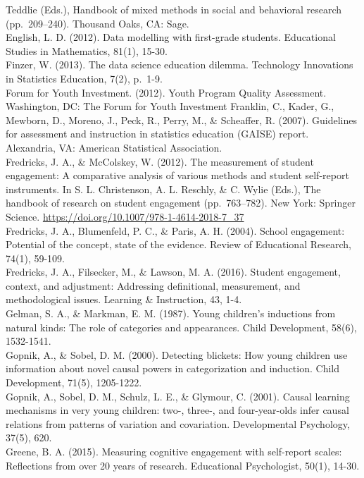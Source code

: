 \documentclass[]{msu-thesis}
\theoremstyle{definition}
\theoremstyle{definition}
\theoremstyle{definition}
\theoremstyle{remark}
\begin{document}
Teddlie (Eds.), Handbook of mixed methods in social and behavioral
research (pp.~209--240). Thousand Oaks, CA: Sage.\\
English, L. D. (2012). Data modelling with first-grade students.
Educational Studies in Mathematics, 81(1), 15-30.\\
Finzer, W. (2013). The data science education dilemma. Technology
Innovations in Statistics Education, 7(2), p.~1-9.\\
Forum for Youth Investment. (2012). Youth Program Quality Assessment.
Washington, DC: The Forum for Youth Investment Franklin, C., Kader, G.,
Mewborn, D., Moreno, J., Peck, R., Perry, M., \& Scheaffer, R. (2007).
Guidelines for assessment and instruction in statistics education
(GAISE) report. Alexandria, VA: American Statistical Association.\\
Fredricks, J. A., \& McColskey, W. (2012). The measurement of student
engagement: A comparative analysis of various methods and student
self-report instruments. In S. L. Christenson, A. L. Reschly, \& C.
Wylie (Eds.), The handbook of research on student engagement
(pp.~763--782). New York: Springer Science.
\url{https://doi.org/10.1007/978-1-4614-2018-7_37}\\
Fredricks, J. A., Blumenfeld, P. C., \& Paris, A. H. (2004). School
engagement: Potential of the concept, state of the evidence. Review of
Educational Research, 74(1), 59-109.\\
Fredricks, J. A., Filsecker, M., \& Lawson, M. A. (2016). Student
engagement, context, and adjustment: Addressing definitional,
measurement, and methodological issues. Learning \& Instruction, 43,
1-4.\\
Gelman, S. A., \& Markman, E. M. (1987). Young children's inductions
from natural kinds: The role of categories and appearances. Child
Development, 58(6), 1532-1541.\\
Gopnik, A., \& Sobel, D. M. (2000). Detecting blickets: How young
children use information about novel causal powers in categorization and
induction. Child Development, 71(5), 1205-1222.\\
Gopnik, A., Sobel, D. M., Schulz, L. E., \& Glymour, C. (2001). Causal
learning mechanisms in very young children: two-, three-, and
four-year-olds infer causal relations from patterns of variation and
covariation. Developmental Psychology, 37(5), 620.\\
Greene, B. A. (2015). Measuring cognitive engagement with self-report
scales: Reflections from over 20 years of research. Educational
Psychologist, 50(1), 14-30.\\
\end{document}
